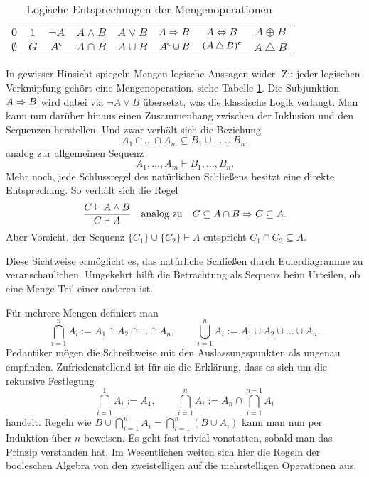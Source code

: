\begin{table}
\begin{center}
\caption{Logische Entsprechungen der Mengenoperationen}
\label{tab:op-Logik-Mengen}
\begin{tabular}{c@{\quad\;\;}c@{\quad\;\;}c@{\quad\;\;}c@{\quad\;\;}%
c@{\quad\;\;}c@{\quad\;\;}c@{\quad\;\;}c}
\toprule
$0$ & $1$ & $\lnot A$ & $A\land B$ & $A\lor B$
& $A\Rightarrow B$ & $A\Leftrightarrow B$ & $A\oplus B$\\
$\emptyset$ & $G$ & $A^\mathsf c$ & $A\cap B$ & $A\cup B$
& $A^\mathsf c\cup B$ & $(A\,\triangle\,B)^\mathsf c$ & $A\:\triangle\:B$\\
\bottomrule
\end{tabular}
\end{center}
\end{table}

In gewisser Hinsicht spiegeln Mengen logische Aussagen wider.
Zu jeder logischen Verknüpfung gehört eine Mengenoperation, siehe
Tabelle \ref{tab:op-Logik-Mengen}. Die Subjunktion $A\Rightarrow B$
wird dabei via $\lnot A\lor B$ übersetzt, was die klassische Logik
verlangt. Man kann nun darüber hinaus einen
Zusammenhang zwischen der Inklusion und den Sequenzen
herstellen. Und zwar verhält sich die Beziehung
\[A_1\cap\ldots\cap A_m\subseteq B_1\cup\ldots\cup B_n.\]
analog zur allgemeinen Sequenz
\[A_1,\ldots,A_m\vdash B_1,\ldots,B_n.\]
Mehr noch, jede Schlussregel des natürlichen Schließens besitzt eine
direkte Entsprechung. So verhält sich die Regel
\[\frac{C\vdash A\land B}{C\vdash A}
\quad\text{analog zu}\quad C\subseteq A\cap B\Rightarrow C\subseteq A.\]
Aber Vorsicht, der Sequenz $\{C_1\}\cup\{C_2\}\vdash A$ entspricht
$C_1\cap C_2\subseteq A$.

Diese Sichtweise ermöglicht es, das natürliche Schließen durch
Eulerdiagramme zu veranschaulichen. Umgekehrt hilft die Betrachtung
als Sequenz beim Urteilen, ob eine Menge Teil einer anderen ist.

Für mehrere Mengen definiert man
\[\bigcap_{i=1}^n A_i := A_1\cap A_2\cap\ldots\cap A_n,\qquad
\bigcup_{i=1}^n A_i := A_1\cup A_2\cup\ldots\cup A_n.\]
Pedantiker mögen die Schreibweise mit den Auslassungspunkten als
ungenau empfinden. Zufriedenstellend ist für sie die Erklärung, dass
es sich um die rekursive Festlegung%
\[\bigcap_{i=1}^1 A_i := A_1,\qquad
\bigcap_{i=1}^n A_i := A_n\cap\bigcap_{i=1}^{n-1} A_i\]
handelt. Regeln wie $B\cup\bigcap_{i=1}^n A_i
= \bigcap_{i=1}^n (B\cup A_i)$ kann man nun per Induktion über $n$
beweisen. Es geht fast trivial vonstatten, sobald man das Prinzip
verstanden hat. Im Wesentlichen weiten sich hier die Regeln der
booleschen Algebra von den zweistelligen auf die mehrstelligen
Operationen aus.

